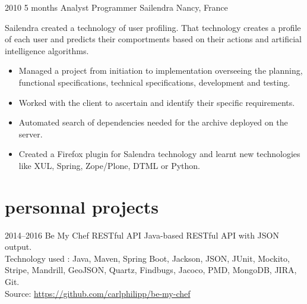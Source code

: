 \documentclass[]{friggeri-cv} %
\begin{document}

\begin{entrylist}

\entry
{2010}
{5 months}
{Analyst Programmer} 
{Sailendra}
{Nancy, France}
{Sailendra created a technology of user profiling. That technology creates a profile of each user and predicts their comportments based on their actions and artificial intelligence algorithms.\\

\vspace{-4mm}
\begin{itemize}
	\item Managed a project from initiation to implementation overseeing the planning, functional specifications, technical specifications, development and testing.
	\item Worked with the client to ascertain and identify their specific requirements.
	\item Automated search of dependencies needed for the archive deployed on the server.
   \item Created a Firefox plugin for Salendra technology and learnt new technologies like XUL, Spring, Zope/Plone, DTML or Python.
\end{itemize}}
\vspace{-7mm}

\end{entrylist}


\section{personnal projects}

\begin{entrylist}

\entry
{2014--2016}
{}
{Be My Chef}
{  RESTful API}
{}
{Java-based RESTful API with JSON output.\\
Technology used : Java, Maven, Spring Boot, Jackson, JSON, JUnit, Mockito, Stripe, Mandrill, GeoJSON, Quartz, Findbugs, Jacoco, PMD, MongoDB, JIRA, Git.\\
\footnotesize{Source: \href{https://github.com/carlphilipp/be-my-chef}{https://github.com/carlphilipp/be-my-chef}}
}

\end{entrylist}
\end{document}
